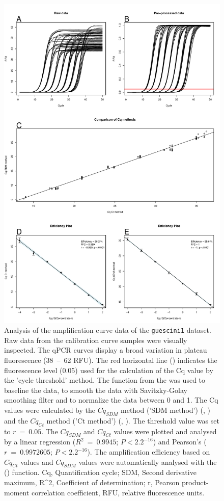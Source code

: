 \begin{figure}[htbp]
  \centering
  \includegraphics[clip=truec,trim=0.9cm 0.7cm 0.9cm 5cm, width=12cm]{figures/dilution_Cq.pdf}
  \caption{Analysis of the amplification curve data of the \texttt{guescini1} 
dataset.  Raw data from the calibration curve samples were visually 
inspected. The qPCR curves display a broad variation in plateau fluorescence 
(38~--~62 RFU). The red horizontal line (\textcolor{red}\textemdash) indicates 
the fluorescence level (0.05) used for the calculation of the Cq value by the 
'cycle threshold' method.  The  function from the 
 was used to baseline the data, to smooth the data with 
Savitzky-Golay smoothing filter and to normalize the data between 0 and 1. 
 The Cq values were calculated by the $Cq_{SDM}$ method ('SDM 
method') (, ) and the $Cq_{Ct}$ method ('Ct 
method') (, ). The threshold value was set to 
$r~=~0.05$. The $Cq_{SDM}$ and $Cq_{Ct}$ values were plotted and analysed by a 
linear regression ($R^{2}~=~0.9945$; $P < 2.2^{-16}$) and Pearson's 
($r~=~0.9972605$; $P < 2.2^{-16}$). The amplification efficiency based on 
 $Cq_{Ct}$ values and  $Cq_{SDM}$ values were 
automatically analysed with the  () function. Cq, 
Quantification cycle; SDM, Second derivative maximum, R\textasciicircum2, 
Coefficient of determination; r, Pearson product-moment correlation 
coefficient, RFU, relative fluorescence units.}
  \label{figure:dilution_Cq}
\end{figure}

